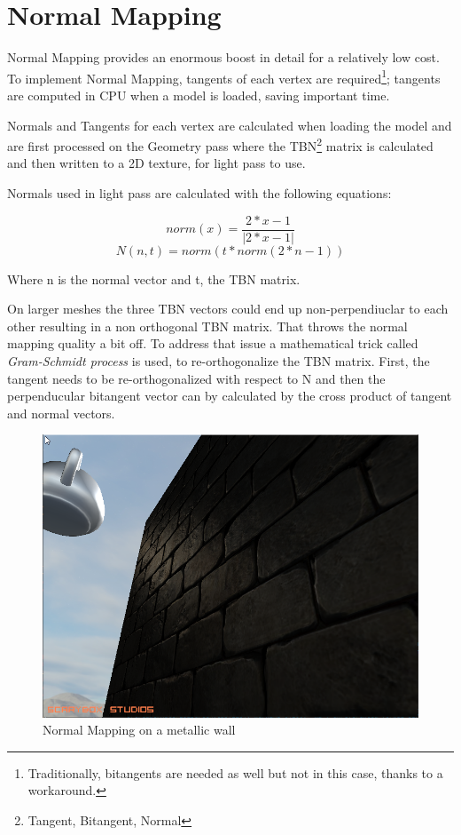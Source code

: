 \section{Normal Mapping}
Normal Mapping provides an enormous boost in detail for a relatively low cost. To implement
Normal Mapping, tangents of each vertex are required\footnote{Traditionally, bitangents are
needed as well but not in this case, thanks to a workaround.}; tangents are computed in CPU
when a model is loaded, saving important time.

Normals and Tangents for each vertex are calculated when loading the model and are first processed
on the Geometry pass where the TBN\footnote{Tangent, Bitangent, Normal} matrix is calculated and
then written to a 2D texture, for light pass to use.

\noindent Normals used in light pass are calculated with the following equations:

$$norm(x)=\frac{2*x - 1}{\vert 2*x - 1 \vert}$$
$$N(n, t)=norm(t*norm(2*n - 1))$$

\noindent Where n is the normal vector and t, the TBN matrix.

On larger meshes the three TBN vectors could end up non-perpendiuclar to each other resulting in
a non orthogonal TBN matrix. That throws the normal mapping quality a bit off. To address that
issue a mathematical trick called \textit{Gram-Schmidt process} is used, to re-orthogonalize
the TBN matrix. First, the tangent needs to be re-orthogonalized with respect to N and then
the perpenducular bitangent vector can by calculated by the cross product of tangent and normal
vectors.

\begin{figure}[h]
    \centering
    \includegraphics[scale=0.4,clip=true]{./image/nm1.png}
    \caption{Normal Mapping on a metallic wall}
\end{figure}

